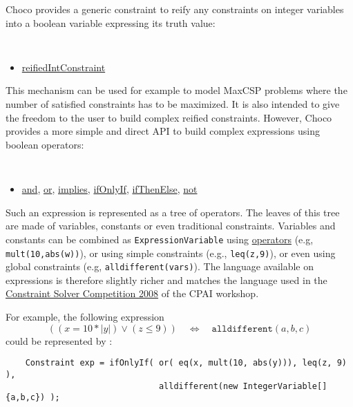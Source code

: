 Choco provides a generic constraint to reify any constraints on integer variables into a boolean variable expressing its truth value:
\begin{notedef}\tt
  \begin{itemize}
  \item \hyperlink{reifiedintconstraint:reifiedintconstraintconstraint}{reifiedIntConstraint}
  \end{itemize}
\end{notedef}
This mechanism can be used for example to model MaxCSP problems where the number of satisfied constraints has to be maximized.
It is also intended to give the freedom to the user to build complex reified constraints. However, Choco provides a more simple and direct API to build complex expressions using boolean operators:
\begin{notedef}\tt
  \begin{itemize}
  \item \hyperlink{and:andconstraint}{and}, \hyperlink{or:orconstraint}{or}, \hyperlink{implies:impliesconstraint}{implies}, \hyperlink{ifonlyif:ifonlyifconstraint}{ifOnlyIf}, \hyperlink{ifthenelse:ifthenelseconstraint}{ifThenElse}, \hyperlink{not:notconstraint}{not}
  \end{itemize}
\end{notedef}
Such an expression is represented as a tree of operators. The leaves of this tree are made of variables, constants or even traditional constraints. Variables and constants can be combined as \texttt{ExpressionVariable} using \hyperlink{model:expressionvariables}{operators} (e.g, \texttt{mult(10,abs(w))}), or using simple constraints (e.g., \texttt{leq(z,9)}), or even using global constraints (e.g, \texttt{alldifferent(vars)}).
The language available on expressions is therefore slightly richer and matches the language used in the \href{http://cpai.ucc.ie/08/}{Constraint Solver Competition 2008} of the CPAI workshop.

For example, the following expression
$$((x = 10 * |y|) \lor (z \le 9))\quad \iff\quad \texttt{alldifferent}(a,b,c)$$
could be represented by :
\begin{lstlisting}
	Constraint exp = ifOnlyIf( or( eq(x, mult(10, abs(y))), leq(z, 9) ), 
                               alldifferent(new IntegerVariable[]{a,b,c}) );
\end{lstlisting}

